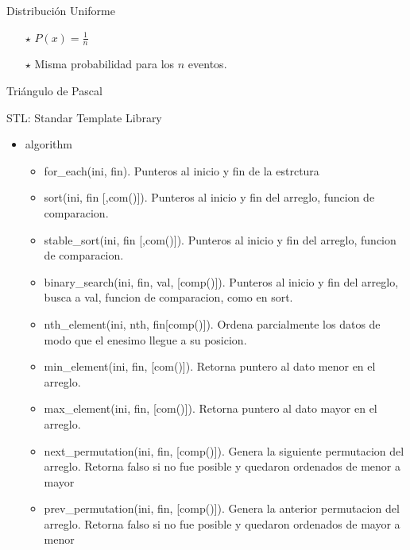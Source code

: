 \documentclass[a4paper,spanish,10pt]{article}
\begin{document}
\begin{itemize}
{			Distribuci\'on Uniforme
			\begin{itemize}
				\item [$\star$] $P(x)=\frac{1}{n}$
				\item [$\star$]  Misma probabilidad para los $n$ eventos.
			\end{itemize}
		}
		Tri\'angulo de Pascal\\
	\end{itemize}
	\newpage
	STL: Standar Template Library
	\begin{itemize}
		\item{ algorithm
			\begin{itemize}
				\item for\_each(ini, fin). Punteros al inicio y fin de la estrctura
				\item sort(ini, fin [,com()]). Punteros al inicio y fin del arreglo, funcion de comparacion.
				\item stable\_sort(ini, fin [,com()]). Punteros al inicio y fin del arreglo, funcion de comparacion.
				\item binary\_search(ini, fin, val, [comp()]). Punteros al inicio y fin del arreglo, busca a val, funcion de comparacion, como en sort. 
				\item nth\_element(ini, nth, fin[comp()]). Ordena parcialmente los datos de modo que el enesimo llegue a su posicion. 
				\item min\_element(ini, fin, [com()]). Retorna puntero al dato menor en el arreglo.
				\item max\_element(ini, fin, [com()]). Retorna puntero al dato mayor en el arreglo.
				\item next\_permutation(ini, fin, [comp()]). Genera la siguiente permutacion del arreglo. Retorna falso si no fue posible y quedaron ordenados de menor a mayor
				\item prev\_permutation(ini, fin, [comp()]). Genera la anterior permutacion del arreglo. Retorna falso si no fue posible y quedaron ordenados de mayor a menor
			\end{itemize}
		}
	\end{itemize}
\end{document}
